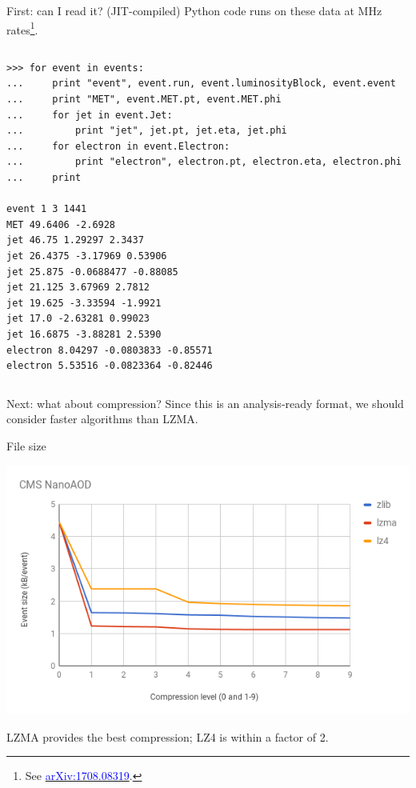 \documentclass{beamer}
\begin{document}
\begin{frame}[fragile]{First: can I read it?}
(JIT-compiled) Python code runs on these data at MHz rates\footnote{See \href{https://arxiv.org/abs/1708.08319}{\textcolor{blue}{arXiv:1708.08319}}.}.

\begin{columns}
\scriptsize
\begin{verbatim}
>>> for event in events:
...     print "event", event.run, event.luminosityBlock, event.event
...     print "MET", event.MET.pt, event.MET.phi
...     for jet in event.Jet:
...         print "jet", jet.pt, jet.eta, jet.phi
...     for electron in event.Electron:
...         print "electron", electron.pt, electron.eta, electron.phi
...     print

event 1 3 1441
MET 49.6406 -2.6928
jet 46.75 1.29297 2.3437
jet 26.4375 -3.17969 0.53906
jet 25.875 -0.0688477 -0.88085
jet 21.125 3.67969 2.7812
jet 19.625 -3.33594 -1.9921
jet 17.0 -2.63281 0.99023
jet 16.6875 -3.88281 2.5390
electron 8.04297 -0.0803833 -0.85571
electron 5.53516 -0.0823364 -0.82446                                                    
\end{verbatim}
\end{columns}
\end{frame}

\begin{frame}{Next: what about compression?}
\vspace{0.5 cm}
Since this is an analysis-ready format, we should consider faster algorithms than LZMA.

\vspace{1 cm}

\vspace{1 cm}
\end{frame}

\begin{frame}{File size}
\begin{center}
\includegraphics[width=\linewidth]{size-vs-compression.png}
\end{center}

LZMA provides the best compression; LZ4 is within a factor of 2.
\vspace{\baselineskip}
\end{frame}
\end{document}
